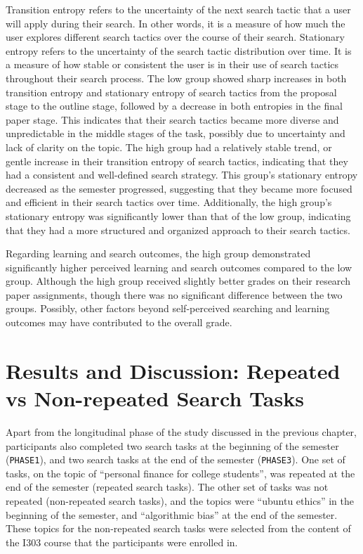 \documentclass[letterpaper, nobind]{templates/ociamthesis}
\begin{document}
Transition entropy refers to the uncertainty of the next search tactic that a user will apply during their search.
In other words, it is a measure of how much the user explores different search tactics over the course of their search.
Stationary entropy refers to the uncertainty of the search tactic distribution over time.
It is a measure of how stable or consistent the user is in their use of search tactics throughout their search process.
The low group showed sharp increases in both transition entropy and stationary entropy of search tactics from the proposal stage to the outline stage, followed by a decrease in both entropies in the final paper stage.
This indicates that their search tactics became more diverse and unpredictable in the middle stages of the task, possibly due to uncertainty and lack of clarity on the topic.
The high group had a relatively stable trend, or gentle increase in their transition entropy of search tactics, indicating that they had a consistent and well-defined search strategy.
This group's stationary entropy decreased as the semester progressed, suggesting that they became more focused and efficient in their search tactics over time.
Additionally, the high group's stationary entropy was significantly lower than that of the low group, indicating that they had a more structured and organized approach to their search tactics.

Regarding learning and search outcomes, the high group demonstrated significantly higher perceived learning and search outcomes compared to the low group.
Although the high group received slightly better grades on their research paper assignments, though there was no significant difference between the two groups.
Possibly, other factors beyond self-perceived searching and learning outcomes may have contributed to the overall grade.

\hypertarget{results-and-discussion-repeated-vs-non-repeated-search-tasks}{%
\chapter{Results and Discussion: Repeated vs Non-repeated Search Tasks}\label{results-and-discussion-repeated-vs-non-repeated-search-tasks}}

Apart from the longitudinal phase of the study discussed in the previous chapter, participants also completed two search tasks at the beginning of the semester (\texttt{PHASE1}), and two search tasks at the end of the semester (\texttt{PHASE3}).
One set of tasks, on the topic of ``personal finance for college students'', was repeated at the end of the semester (repeated search tasks).
The other set of tasks was not repeated (non-repeated search tasks), and the topics were ``ubuntu ethics'' in the beginning of the semester, and ``algorithmic bias'' at the end of the semester.
These topics for the non-repeated search tasks were selected from the content of the I303 course that the participants were enrolled in.
\end{document}
